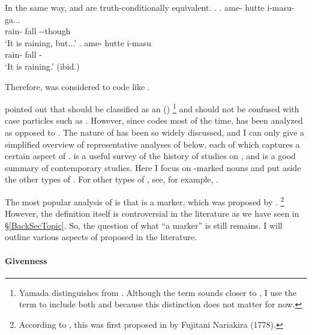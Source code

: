 In the same way,
\Next[a] and \Next[b] are truth-conditionally equivalent.
%
\ex.
 \ag. ame- hutte i-masu-ga... \\
      rain- fall --though \\
      `It is raining, but...'
 \bg. ame- hutte i-masu \\
      rain- fall - \\
      `It is raining.'
      \hfill{(ibid.)}

Therefore,  was considered to code  like .

 pointed out that
 should be classified as an  ()%
 \footnote{
 Yamada distinguishes  from .
 Although the  term  sounds closer to
 ,
 I use the term  to include both
  and 
 because this distinction does not matter for now. 
 }
and should not be confused with case particles such as .
However, since  codes  most of the time,
 has been analyzed as opposed to .
The nature of  has been so widely discussed, and
I can only give a simplified overview of representative analyses of  below,
each of which captures a certain aspect of .
 is a useful survey of the history of studies on ,
and  is a good summary of contemporary studies.
Here I focus on -marked nouns and put aside the other types of .
For other types of ,
see, for example, .

The most popular analysis of 
is that  is a  marker,
which was proposed by .%
 \footnote{
 According to ,
 this was first proposed in  by Fujitani Nariakira (1778).
 }
However, the definition  itself is controversial in the literature
as we have seen in \S \ref{BackSecTopic}.
So, the question of what ``a  marker'' is still remains.
I will outline various aspects of  proposed in the literature.

\paragraph{Givenness}

